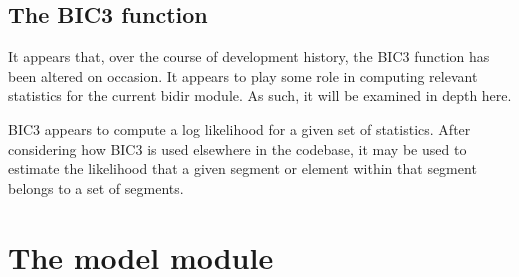 \documentclass[12pt,letterpaper]{article}
\begin{document}
\subsection{The BIC3 function}
It appears that, over the course of development history, the BIC3 function has been altered on occasion. It appears to play some role in computing relevant statistics for the current bidir module. As such, it will be examined in depth here.

BIC3 appears to compute a log likelihood for a given set of statistics. After considering how BIC3 is used elsewhere in the codebase, it may be used to estimate the likelihood that a given segment or element within that segment belongs to a set of segments. 



\section{The model module}
\end{document}
